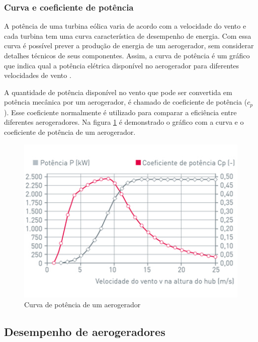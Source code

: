 \subsubsection{Curva e coeficiente de potência}
\label{Sec:curvaDePotencia}

A potência de uma turbina eólica varia de acordo com a velocidade do vento e cada turbina tem uma curva característica de desempenho de energia. Com essa curva é possível prever a produção de energia de um aerogerador, sem considerar detalhes técnicos de seus componentes. Assim, a curva de potência é um gráfico que indica qual a potência elétrica disponível no aerogerador para diferentes velocidades de vento \cite{iec-power-performance}.

A quantidade de potência disponível no vento que pode ser convertida em potência mecânica por um aerogerador, é chamado de coeficiente de potência ($c_p$). Esse coeficiente normalmente é utilizado para comparar a eficiência entre diferentes aerogeradores. Na figura \ref{Fig:ilustracaoCurvaPotencia} é demonstrado o gráfico com a curva e o coeficiente de potência de um aerogerador. 

\begin{figure}[htbp!] \begin{center}
\includegraphics[width=0.75\linewidth]{./figuras/curva-potencia-wobben}
\caption{Curva de potência de um aerogerador}
\label{Fig:ilustracaoCurvaPotencia}
\end{center} 
\end{figure}

\subsection{Desempenho de aerogeradores}
\label{Sec:desempenhoDeAerogeradores}

